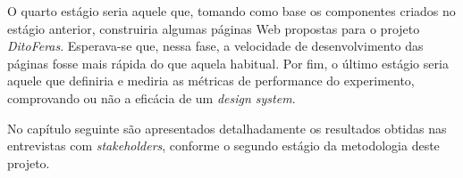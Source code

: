 O quarto estágio seria aquele que, tomando como base os componentes criados no estágio anterior, construiria algumas páginas Web propostas para o projeto \textit{DitoFeras}. Esperava-se que, nessa fase, a velocidade de desenvolvimento das páginas fosse mais rápida do que aquela habitual. Por fim, o último estágio seria aquele que definiria e mediria as métricas de performance do experimento, comprovando ou não a eficácia de um \textit{design system}.

No capítulo seguinte são apresentados detalhadamente os resultados obtidas nas entrevistas com \textit{stakeholders}, conforme o segundo estágio da metodologia deste projeto.
